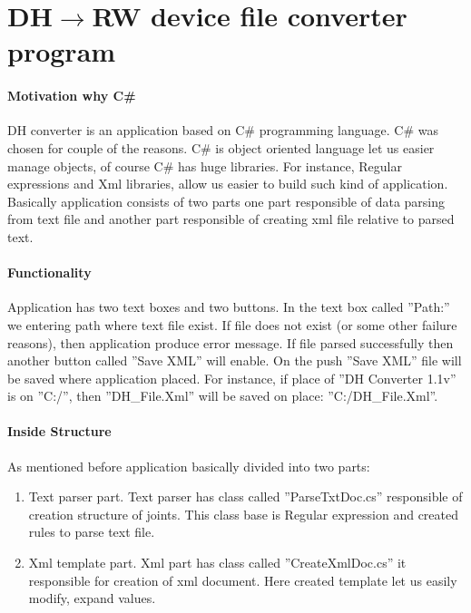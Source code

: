 \section{DH$\rightarrow$RW device file converter program}
\label{sec:program}

\paragraph{Motivation why C\#}
DH converter is an application based on C\# programming language. C\# was chosen for couple of the reasons. C\# is object oriented language let us easier manage objects, of course C\# has huge libraries. For instance, Regular expressions and Xml libraries, allow us easier to build such kind of application.
Basically application consists of two parts one part responsible of data parsing from text file and another part responsible of creating xml file relative to parsed text.

\paragraph{Functionality}
Application has two text boxes and two buttons.
In the text box called ''Path:'' we entering path where text file exist. If file does not exist (or some other failure reasons), then application produce error message. If file parsed successfully then another button called ''Save XML'' will enable. On the push ''Save XML'' file will be saved where application placed. For instance, if place of ''DH Converter 1.1v'' is on ''C:/'', then ''DH\_File.Xml'' will be saved on place: ''C:/DH\_File.Xml''.

\paragraph{Inside Structure}
As mentioned before application basically divided into two parts:
\begin{enumerate}
	\item Text parser part. Text parser has class called ''ParseTxtDoc.cs'' responsible of creation structure of joints. This class base is Regular expression and created rules to parse text file.\\
	\item Xml template part. Xml part has class called ''CreateXmlDoc.cs'' it responsible for creation of xml document. Here created template let us easily modify, expand values.
\end{enumerate}
